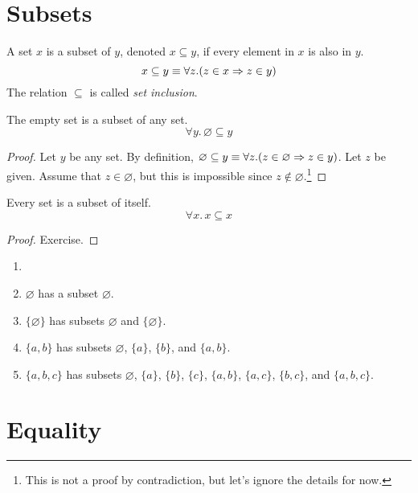 \documentclass{amsart}
\begin{document}
\section{Subsets}
\label{sec:subsets}

\begin{defn}
  A set $x$ is a subset of $y$, denoted $x \subseteq y$, if every element in $x$ is also in $y$.
  \[
    x \subseteq y \equiv \forall z.(z \in x \Rightarrow z \in y)
  \]
  The relation $\subseteq$ is called \emph{set inclusion}.
\end{defn}

\begin{lem}
  The empty set is a subset of any set.
  \[
    \forall y.\,\varnothing \subseteq y
  \]
\end{lem}
\begin{proof}
  Let $y$ be any set.
  By definition, $\varnothing \subseteq y \equiv \forall z.(z \in \varnothing \Rightarrow z \in y)$.
  Let $z$ be given.
  Assume that $z \in \varnothing$, but this is impossible since $z \notin \varnothing$.\footnote{This is not a proof by contradiction, but let's ignore the details for now.}
\end{proof}

\begin{lem}
  Every set is a subset of itself.
  \[
    \forall x.\, x \subseteq x
  \]
\end{lem}
\begin{proof}
  Exercise.
\end{proof}

\begin{eg}\label{eg:subsets}
  \begin{enumerate}
  \item[]
  \item $\varnothing$ has a subset $\varnothing$.
  \item $\{ \varnothing \}$ has subsets $\varnothing$ and $\{ \varnothing \}$.
  \item $\{ a,b \}$ has subsets $\varnothing$, $\{ a \}$, $\{ b \}$, and $\{ a, b \}$.
  \item $\{ a,b,c \}$ has subsets $\varnothing$, $\{ a \}$, $\{ b \}$, $\{ c \}$, $\{ a,b \}$, $\{ a,c \}$, $\{ b,c \}$, and $\{ a,b,c \}$.
  \end{enumerate}
\end{eg}

\section{Equality}
\label{sec:equality}
\end{document}
